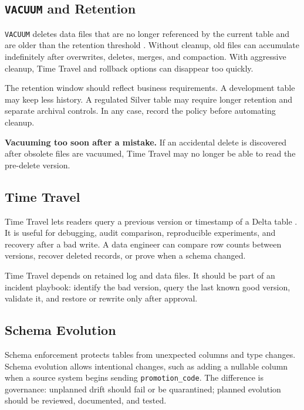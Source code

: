\subsection{\texttt{VACUUM} and Retention}
\texttt{VACUUM} deletes data files that are no longer referenced by the current table and are older than the retention threshold \cite{microsoftFabricVacuum}. Without cleanup, old files can accumulate indefinitely after overwrites, deletes, merges, and compaction. With aggressive cleanup, Time Travel and rollback options can disappear too quickly.

The retention window should reflect business requirements. A development table may keep less history. A regulated Silver table may require longer retention and separate archival controls. In any case, record the policy before automating cleanup.

\begin{pitfall}
\textbf{Vacuuming too soon after a mistake.} If an accidental delete is discovered after obsolete files are vacuumed, Time Travel may no longer be able to read the pre-delete version.
\end{pitfall}

\subsection{Time Travel}
Time Travel lets readers query a previous version or timestamp of a Delta table \cite{deltaLakeDocs}. It is useful for debugging, audit comparison, reproducible experiments, and recovery after a bad write. A data engineer can compare row counts between versions, recover deleted records, or prove when a schema changed.

Time Travel depends on retained log and data files. It should be part of an incident playbook: identify the bad version, query the last known good version, validate it, and restore or rewrite only after approval.

\subsection{Schema Evolution}
Schema enforcement protects tables from unexpected columns and type changes. Schema evolution allows intentional changes, such as adding a nullable column when a source system begins sending \texttt{promotion\_code}. The difference is governance: unplanned drift should fail or be quarantined; planned evolution should be reviewed, documented, and tested.

